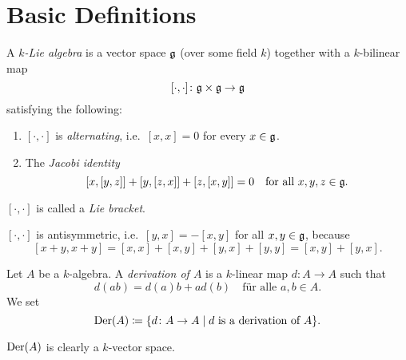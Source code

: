 \section{Basic Definitions}


\begin{defi}
 A \emph{$k$-Lie algebra} is a vector space $\mathfrak{g}$ (over some field $k$) together with a $k$-bilinear map
 \[
  [\cdot, \cdot] \colon \mathfrak{g} \times \mathfrak{g} \to \mathfrak{g}
 \]
 satisfying the following:
 \begin{enumerate}
  \item
   $[\cdot, \cdot]$ is \emph{alternating}, i.e.\ $[x,x] = 0$ for every $x \in \mathfrak{g}$.
  \item
   The \emph{Jacobi identity}
   \[
    [x,[y,z]] + [y,[z,x]] + [z,[x,y]] = 0
    \quad
    \text{for all $x,y,z \in \mathfrak{g}$}.
   \]
 \end{enumerate}
 $[\cdot,\cdot]$ is called a \emph{Lie bracket}.
\end{defi}


\begin{rem}
 $[\cdot, \cdot]$ is antisymmetric, i.e.\ $[y,x] = -[x,y]$ for all $x,y \in \mathfrak{g}$, because
 \[
  [x+y, x+y] = [x,x] + [x,y] + [y,x] + [y,y] = [x,y] + [y,x].
 \]
\end{rem}


\begin{defi}
 Let $A$ be a $k$-algebra. A \emph{derivation of $A$} is a $k$-linear map $d \colon A \to A$ such that
 \[
  d(ab) = d(a)b + ad(b) \quad \text{für alle $a,b \in A$}.
 \]
 We set
 \[
  \operatorname{Der}(A) \coloneqq \{d \colon A \to A \mid \text{$d$ is a derivation of $A$} \}.
 \]
\end{defi}


\begin{rem}
 $\operatorname{Der}(A)$ is clearly a $k$-vector space.
\end{rem}



